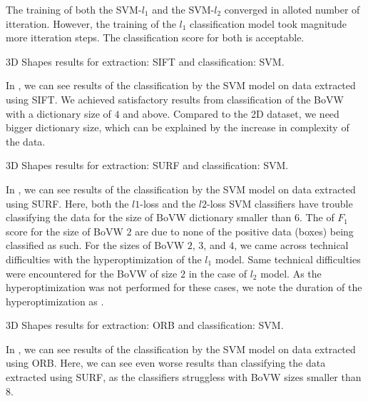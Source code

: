 The training of both the SVM-$l_1$ and the SVM-$l_2$ converged in alloted number of itteration. However, the training of the $l_1$ classification model took magnitude more itteration steps. The classification score for both is acceptable.

\begin{table}[ht!]
    \centering
    
    \caption[3D Shapes results for extraction: SIFT and classification: SVM]{3D Shapes results for extraction: SIFT and classification: SVM.}
    \label{tab:3d_SIFT_SVM}
\end{table}
In , we can see results of the classification by the SVM model on data extracted using SIFT. We achieved satisfactory results from classification of the BoVW with a dictionary size of $4$ and above. Compared to the 2D dataset, we need bigger dictionary size, which can be explained by the increase in complexity of the data.

\begin{table}[ht!]
    \centering
    
    \caption[3D Shapes results for extraction: SURF and classification: SVM]{3D Shapes results for extraction: SURF and classification: SVM.}
    \label{tab:3d_SURF_SVM}
\end{table}
In , we can see results of the classification by the SVM model on data extracted using SURF. Here, both the $l1$-loss and the $l2$-loss SVM classifiers have trouble classifying the data for the size of BoVW dictionary smaller than $6$. The  of $F_1$ score for the size of BoVW $2$ are due to none of the positive data (boxes) being classified as such. For the sizes of BoVW $2$, $3$, and $4$, we came across technical difficulties with the hyperoptimization of the $l_1$ model. Same technical difficulties were encountered for the BoVW of size $2$ in the case of $l_2$ model. As the hyperoptimization was not performed for these cases, we note the duration of the hyperoptimization as .

\begin{table}[ht!]
    \centering
    
    \caption[3D Shapes results for extraction: ORB and classification: SVM]{3D Shapes results for extraction: ORB and classification: SVM.}
    \label{tab:3d_ORB_SVM}
\end{table}
In , we can see results of the classification by the SVM model on data extracted using ORB. Here, we can see even worse results than classifying the data extracted using SURF, as the classifiers struggless with BoVW sizes smaller than $8$.

